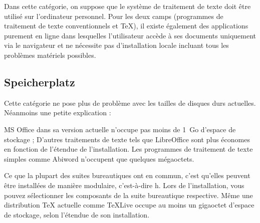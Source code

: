 \documentclass[11pt,a4paper,ngerman,french,DIV=8]{scrartcl}
\begin{document}
Dans cette catégorie, on suppose que le système de traitement de texte doit être utilisé sur l'ordinateur personnel. Pour les deux camps (programmes de traitement de texte conventionnels et \TeX{}), il existe également des applications purement en ligne dans lesquelles l'utilisateur accède à ses documents uniquement via le navigateur et ne nécessite pas d'installation locale incluant tous les problèmes matériels possibles.

\subsection{Speicherplatz}

Cette catégorie ne pose plus de problème avec les tailles de disques durs actuelles. Néanmoins une petite explication :

MS Office dans sa version actuelle n'occupe pas moins de 1~Go d'espace de stockage ; D'autres traitements de texte tels que LibreOffice sont plus économes en fonction de l'étendue de l'installation. Les programmes de traitement de texte simples comme Abiword n'occupent que quelques mégaoctets.

Ce que la plupart des suites bureautiques ont en commun, c'est qu'elles peuvent être installées de manière modulaire, c'est-à-dire h. Lors de l'installation, vous pouvez sélectionner les composants de la suite bureautique respective. Même une distribution \TeX{} actuelle comme TeXLive occupe au moins un gigaoctet d'espace de stockage, selon l'étendue de son installation.
\end{document}
